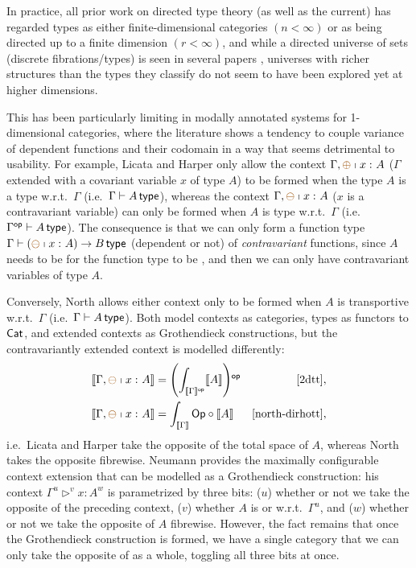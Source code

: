 \documentclass[twoLevelNum]{higherStructures} %
\begin{document}
In practice, all prior work on directed type theory (as well as the current) has regarded types as either finite-dimensional categories $(n < \infty)$ or as being directed up to a finite dimension $(r < \infty)$,
and while a directed universe of sets (discrete fibrations/types) is seen in several papers \cite{2dtt,riehl-shulman-dtt,weaver-licata-dua,dua-simplicial},
universes with richer structures than the types they classify do not seem to have been explored yet at higher dimensions.

This has been particularly limiting in modally annotated systems for 1-dimensional categories, where the literature shows a tendency to couple variance of dependent functions and their codomain in a way that seems detrimental to usability.
For example, Licata and Harper \cite{2dtt} only allow the context $\Gamma, \ctxmodnovar{{\oplus}}{x}{A}$ ($\Gamma$ extended with a covariant variable $x$ of type $A$) to be formed when the type $A$ is a \covarfib{} type w.r.t.\ $\Gamma$ (i.e.\ $\Gamma \vdash A \,\mathsf{type}$), whereas the context $\Gamma, \ctxmodnovar{{\ominus}}{x}{A}$ ($x$ is a contravariant variable) can only be formed when $A$ is \acontravarfib{} type w.r.t.\ $\Gamma$ (i.e.\ $\Gamma^{\mathsf{op}} \vdash A \,\mathsf{type}$).
The consequence is that we can only form a \covarfib{} function type $\Gamma \sez (\ctxmodnovar{{\ominus}}{x}{A}) \to B \type$ (dependent or not) of \emph{contravariant} functions, since $A$ needs to be \contravarfib{} for the function type to be \covarfib{}, and then we can only have contravariant variables of type $A$.

Conversely, North \cite{north-dirhott} allows either context only to be formed when $A$ is transportive w.r.t.\ $\Gamma$ (i.e.\ $\Gamma \vdash A \,\mathsf{type}$).
Both model contexts as categories, types as functors to ${\mathsf{Cat}}$, and extended contexts as Grothendieck constructions, but the contravariantly extended context is modelled differently:
\begin{align*}
	\interp{\Gamma, \ctxmodnovar{{\ominus}}{x}{A}} &= 
	\paren{ \int_{\interp{\Gamma}\op} \interp{A} }\op & \text{\cite{2dtt}}, \\
	\interp{\Gamma, \ctxmodnovar{{\ominus}}{x}{A}} &= \int_{\interp{\Gamma}} \Op \circ \interp{A} & \text{\cite{north-dirhott}},
\end{align*}
i.e.\ Licata and Harper take the opposite of the total space of $A$, whereas North takes the opposite fibrewise.
Neumann \cite{neumann-modal-sogats} provides the maximally configurable context extension that can be modelled as a Grothendieck construction: his context $\Gamma^u \rhd^v x : A^w$ is parametrized by three bits: ($u$) whether or not we take the opposite of the preceding context, ($v$) whether $A$ is \covarfib{} or \contravarfib{} w.r.t.\ $\Gamma^u$, and ($w$) whether or not we take the opposite of $A$ fibrewise.
However, the fact remains that once the Grothendieck construction is formed, we have a single category that we can only take the opposite of as a whole, toggling all three bits at once.
\end{document}
